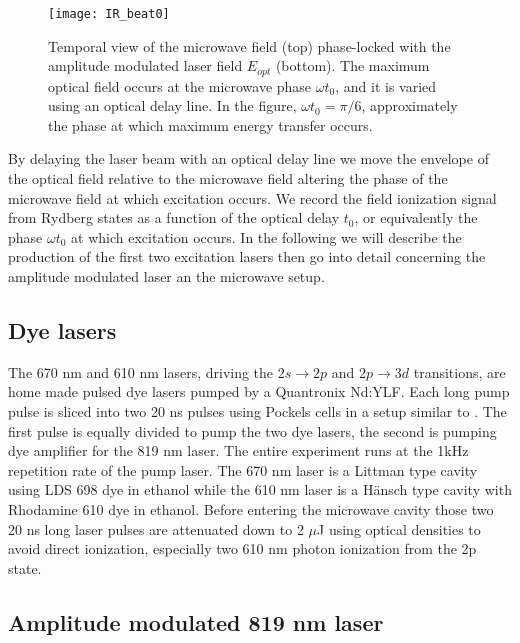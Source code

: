 \documentclass[pra, reprint]{revtex4-1}
\begin{document}
\begin{figure}[h]
  \texttt{[image: IR\_beat0]}
  \caption{Temporal view of the microwave field (top) phase-locked with the amplitude modulated laser field $E_{opt}$ (bottom). The maximum optical field occurs at the microwave phase $\omega t_0$, and it is varied using an optical delay line. In the figure, $\omega t_0 = \pi/6$, approximately the phase at which maximum energy transfer occurs.}
  \label{fig:AMLaser}
\end{figure}
By delaying the laser beam with an optical delay line we move the envelope of the optical field relative to the microwave field altering the phase of the microwave field at which excitation occurs. We record the field ionization signal from Rydberg states as a function of the optical delay $t_0$, or equivalently the phase $\omega t_0$ at which excitation occurs. In the following we will describe the production of the first two excitation lasers then go into detail concerning the amplitude modulated laser an the microwave setup.

\subsection{Dye lasers}
\label{sec:dye-lasers}

The 670 nm and 610 nm lasers, driving the $2s \rightarrow 2p$ and $2p \rightarrow 3d$ transitions, are home made pulsed dye lasers pumped by a Quantronix Nd:YLF\@. Each long pump pulse is sliced into two 20 ns pulses using Pockels cells in a setup similar to \cite{Gurian_2010}. The first pulse is equally divided to pump the two dye lasers, the second is pumping dye amplifier for the 819 nm laser. The entire experiment runs at the 1kHz repetition rate of the pump laser. The 670 nm laser is a Littman type cavity\cite{Littman_1978} using LDS 698 dye in ethanol while the 610 nm laser is a Hänsch type cavity\cite{Hansch_1972} with Rhodamine 610 dye in ethanol. Before entering the microwave cavity those two 20 ns long laser pulses are attenuated down to 2 $\mu$J using optical densities to avoid direct ionization, especially two 610 nm photon ionization from the 2p state.

\subsection{Amplitude modulated 819 nm laser}
\label{sec:ampl-modul-819}
\end{document}
